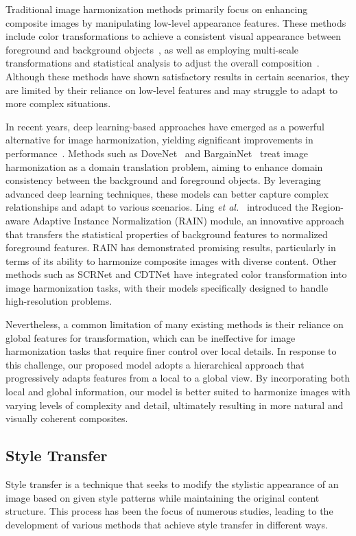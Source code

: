 \documentclass[sigconf]{acmart}
\begin{document}
Traditional image harmonization methods primarily focus on enhancing composite images by manipulating low-level appearance features. These methods include color transformations to achieve a consistent visual appearance between foreground and background objects~\cite{CT,xue2012TG}, as well as employing multi-scale transformations and statistical analysis to adjust the overall composition~\cite{sunkavalli2010multi}. Although these methods have shown satisfactory results in certain scenarios, they are limited by their reliance on low-level features and may struggle to adapt to more complex situations.

In recent years, deep learning-based approaches have emerged as a powerful alternative for image harmonization, yielding significant improvements in performance~\cite{Bargainnet,DIH,IHT,GuoZJGZ21,CDTNet,Harmonizer,liang2021spatial}. Methods such as DoveNet~\cite{DoveNet} and BargainNet~\cite{Bargainnet} treat image harmonization as a domain translation problem, aiming to enhance domain consistency between the background and foreground objects. By leveraging advanced deep learning techniques, these models can better capture complex relationships and adapt to various scenarios. Ling \textit{et al.}~\cite{RAIN} introduced the Region-aware Adaptive Instance Normalization (RAIN) module, an innovative approach that transfers the statistical properties of background features to normalized foreground features. RAIN has demonstrated promising results, particularly in terms of its ability to harmonize composite images with diverse content. Other methods such as SCRNet and CDTNet have integrated color transformation into image harmonization tasks, with their models specifically designed to handle high-resolution problems.

Nevertheless, a common limitation of many existing methods is their reliance on global features for transformation, which can be ineffective for image harmonization tasks that require finer control over local details. In response to this challenge, our proposed model adopts a hierarchical approach that progressively adapts features from a local to a global view. By incorporating both local and global information, our model is better suited to harmonize images with varying levels of complexity and detail, ultimately resulting in more natural and visually coherent composites.

\subsection{Style Transfer}
Style transfer is a technique that seeks to modify the stylistic appearance of an image based on given style patterns while maintaining the original content structure. This process has been the focus of numerous studies, leading to the development of various methods that achieve style transfer in different ways.
\end{document}
